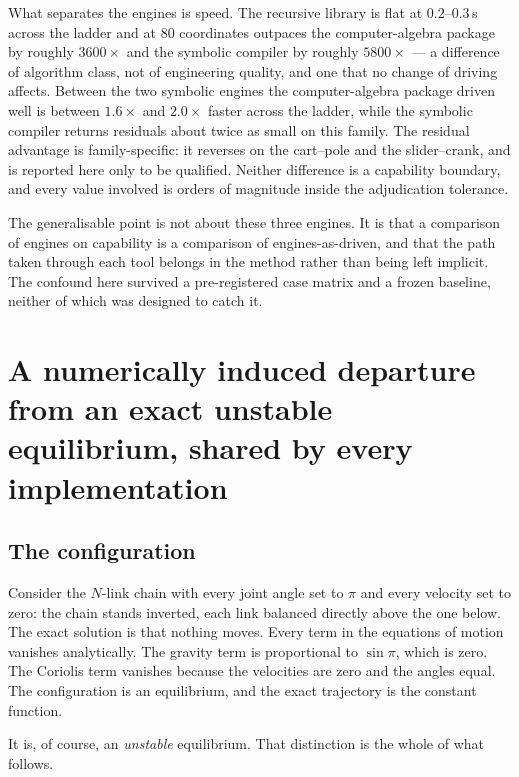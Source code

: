 \documentclass[review,12pt]{elsarticle}
\begin{document}
What separates the engines is speed. The recursive library is flat at
$0.2$--$0.3$\,s across the ladder and at 80 coordinates outpaces the
computer-algebra package by roughly $3600\times$ and the symbolic compiler by
roughly $5800\times$ --- a difference of algorithm class, not of
engineering quality, and one that no change of driving affects. Between the
two symbolic engines the computer-algebra package driven well is between
$1.6\times$ and $2.0\times$ faster across the ladder, while the symbolic
compiler returns residuals
about twice as small on this family. The residual advantage is family-specific:
it reverses on the cart--pole and the slider--crank, and is reported here only
to be qualified. Neither difference is a capability boundary, and every value
involved is orders of magnitude inside the adjudication tolerance.

The generalisable point is not about these three engines. It is that a
comparison of engines on capability is a comparison of engines-as-driven, and
that the path taken through each tool belongs in the method rather than being
left implicit. The confound here survived a pre-registered case matrix and a
frozen baseline, neither of which was designed to catch it.

\section{A numerically induced departure from an exact unstable equilibrium,
shared by every implementation}\label{sec:shared}

\subsection{The configuration}
Consider the $N$-link chain with every joint angle set to $\pi$ and every
velocity set to zero: the chain stands inverted, each link balanced directly
above the one below. The exact solution is that nothing moves. Every term in the
equations of motion vanishes analytically. The gravity term is proportional to
$\sin\pi$, which is zero. The Coriolis term vanishes because the velocities are
zero and the angles equal. The configuration is an equilibrium, and the exact
trajectory is the constant function.

It is, of course, an \emph{unstable} equilibrium. That distinction is the whole
of what follows.
\end{document}
